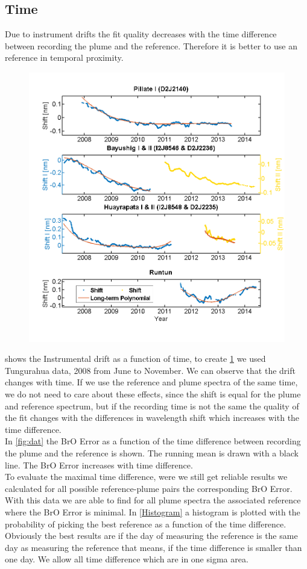 \documentclass  [
  paper    = a4,
  BCOR     = 10mm,
  twoside,
  fontsize = 12pt,
  fleqn,
  toc      = bibnumbered,
  toc      = listofnumbered,
  numbers  = noendperiod,
  headings = normal,
  listof   = leveldown,
  version  = 3.03
]                                       {scrreprt}
\begin{document}
	
	\subsection{Time}
	Due to instrument drifts the fit quality decreases with the time difference between recording the plume and the reference. Therefore it is better to use an reference in temporal proximity.\\
	\begin{figure}[h]
		\centering
		\includegraphics[width=0.7\linewidth]{Bilder/Simon/Bilder_Tung/Drift_Komplett_NEW}
		\caption{}
		\label{fig:driftkomplettnew}
	\end{figure}
	 shows the Instrumental drift as a function of time, to create \cref{fig:driftkomplettnew} we used Tungurahua data, 2008 from June to November. We can observe that the drift changes with time. If we use the reference and plume spectra of the same time, we do not need to care about these effects, since the shift is equal for the plume and reference spectrum, but if the recording time is not the same the quality of the fit changes with the differences in wavelength shift which increases with the time difference.\\
	In \cref{fig:dat} the BrO Error as a function of the time difference between recording the plume and the reference is shown. The running mean is drawn with a black line. The BrO Error increases with time difference.\\
	To evaluate the maximal time difference, were we still get reliable results we calculated for all possible reference-plume pairs the corresponding BrO Error. With this data we are able to find for all plume spectra the associated reference where the BrO Error is minimal. In \cref{Histogram} a histogram is plotted with the probability of picking the best reference as a function of the time difference. Obviously the best results are if the day of measuring the reference is the same day as measuring the reference that means, if the time difference is smaller than one day. We allow all time difference which are in one sigma area. 
	
\end{document}
